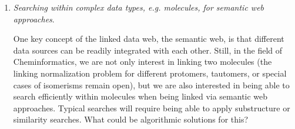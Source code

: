 \documentclass{sig-alternate}
\begin{document}
\begin{enumerate}
\item \emph{Searching within complex data types, e.g. molecules, for semantic web approaches}.

  One key concept of the linked data web, the semantic web, is that
  different data sources can be readily integrated with each
  other. Still, in the field of Cheminformatics, we are not only
  interest in linking two molecules (the linking normalization problem
  for different protomers, tautomers, or special cases of isomerisms
  remain open), but we are also interested in being able to search
  efficiently within molecules when being linked via semantic web
  approaches. Typical searches will require being able to apply
  substructure or similarity searches.  What could be algorithmic
  solutions for this?
\end{enumerate}
\end{document}
